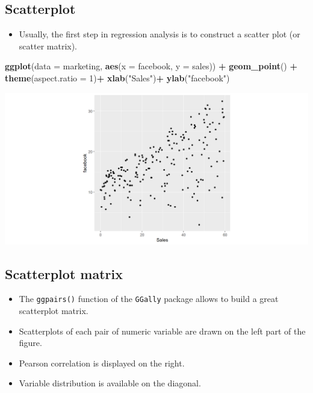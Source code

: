 \documentclass[
]{book}
\newenvironment{Shaded}{\begin{snugshade}}{\end{snugshade}}
\newcommand{\AttributeTok}[1]{\textcolor[rgb]{0.13,0.29,0.53}{#1}}
\newcommand{\DecValTok}[1]{\textcolor[rgb]{0.00,0.00,0.81}{#1}}
\newcommand{\FunctionTok}[1]{\textcolor[rgb]{0.13,0.29,0.53}{\textbf{#1}}}
\newcommand{\NormalTok}[1]{#1}
\newcommand{\SpecialCharTok}[1]{\textcolor[rgb]{0.81,0.36,0.00}{\textbf{#1}}}
\newcommand{\StringTok}[1]{\textcolor[rgb]{0.31,0.60,0.02}{#1}}
\providecommand{\tightlist}{%
  \setlength{\itemsep}{0pt}\setlength{\parskip}{0pt}}
\begin{document}
\hypertarget{scatterplot}{%
\subsection{Scatterplot}\label{scatterplot}}

\begin{itemize}
\tightlist
\item
  Usually, the first step in regression analysis is to construct a scatter plot (or scatter matrix).
\end{itemize}

\begin{Shaded}
\begin{Highlighting}[]
\FunctionTok{ggplot}\NormalTok{(}\AttributeTok{data =}\NormalTok{ marketing, }\FunctionTok{aes}\NormalTok{(}\AttributeTok{x =}\NormalTok{ facebook, }\AttributeTok{y =}\NormalTok{ sales)) }\SpecialCharTok{+}
  \FunctionTok{geom\_point}\NormalTok{() }\SpecialCharTok{+}
  \FunctionTok{theme}\NormalTok{(}\AttributeTok{aspect.ratio =} \DecValTok{1}\NormalTok{)}\SpecialCharTok{+}
  \FunctionTok{xlab}\NormalTok{(}\StringTok{"Sales"}\NormalTok{)}\SpecialCharTok{+}
  \FunctionTok{ylab}\NormalTok{(}\StringTok{"facebook"}\NormalTok{)}
\end{Highlighting}
\end{Shaded}

\begin{center}\includegraphics{figure/unnamed-chunk-26-1} \end{center}

\hypertarget{scatterplot-matrix}{%
\subsection{Scatterplot matrix}\label{scatterplot-matrix}}

\begin{itemize}
\tightlist
\item
  The \texttt{ggpairs()} function of the \texttt{GGally} package allows to build a great scatterplot matrix.
\item
  Scatterplots of each pair of numeric variable are drawn on the left part of the figure.
\item
  Pearson correlation is displayed on the right.
\item
  Variable distribution is available on the diagonal.
\end{itemize}
\end{document}
